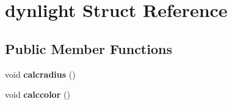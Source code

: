 \hypertarget{structdynlight}{}\section{dynlight Struct Reference}
\label{structdynlight}
\subsection*{Public Member Functions}
\begin{DoxyCompactItemize}
\item 
\mbox{\label{structdynlight_aae27a9f01e6288f95140a6aba456b3c1}} 
void {\bfseries calcradius} ()
\item 
\mbox{\label{structdynlight_aa5fa1fe1523322704c9fe3204ea124fe}} 
void {\bfseries calccolor} ()
\end{DoxyCompactItemize}
